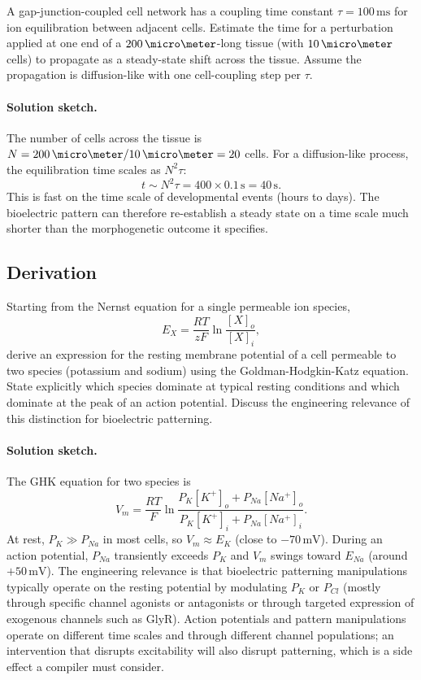 \begin{exercise}
A gap-junction-coupled cell network has a coupling time constant
$\tau = 100\,\text{ms}$ for ion equilibration between adjacent cells.
Estimate the time for a perturbation applied at one end of a
$200\,\micro\meter$-long tissue (with $10\,\micro\meter$ cells) to
propagate as a steady-state shift across the tissue. Assume the
propagation is diffusion-like with one cell-coupling step per $\tau$.

\paragraph{Solution sketch.}
The number of cells across the tissue is
$N = 200\,\micro\meter / 10\,\micro\meter = 20$ cells. For a
diffusion-like process, the equilibration time scales as $N^2 \tau$:
\[
t \sim N^2 \tau = 400 \times 0.1\,\text{s} = 40\,\text{s}.
\]
This is fast on the time scale of developmental events (hours to
days). The bioelectric pattern can therefore re-establish a steady
state on a time scale much shorter than the morphogenetic outcome it
specifies.
\end{exercise}

\subsection*{Derivation}

\begin{exercise}
Starting from the Nernst equation for a single permeable ion species,
\[
E_X = \frac{RT}{zF}\ln\frac{[X]_o}{[X]_i},
\]
derive an expression for the resting membrane potential of a cell
permeable to two species (potassium and sodium) using the
Goldman-Hodgkin-Katz equation. State explicitly which species
dominate at typical resting conditions and which dominate at the
peak of an action potential. Discuss the engineering relevance of
this distinction for bioelectric patterning.

\paragraph{Solution sketch.}
The GHK equation for two species is
\[
V_m = \frac{RT}{F}\ln\frac{P_K [K^+]_o + P_{Na} [Na^+]_o}
{P_K [K^+]_i + P_{Na} [Na^+]_i}.
\]
At rest, $P_K \gg P_{Na}$ in most cells, so $V_m \approx E_K$ (close
to $-70\,\text{mV}$). During an action potential, $P_{Na}$
transiently exceeds $P_K$ and $V_m$ swings toward $E_{Na}$ (around
$+50\,\text{mV}$). The engineering relevance is that bioelectric
patterning manipulations typically operate on the resting potential by
modulating $P_K$ or $P_{Cl}$ (mostly through specific channel agonists
or antagonists or through targeted expression of exogenous channels
such as GlyR). Action potentials and pattern manipulations operate on
different time scales and through different channel populations; an
intervention that disrupts excitability will also disrupt patterning,
which is a side effect a compiler must consider.
\end{exercise}

